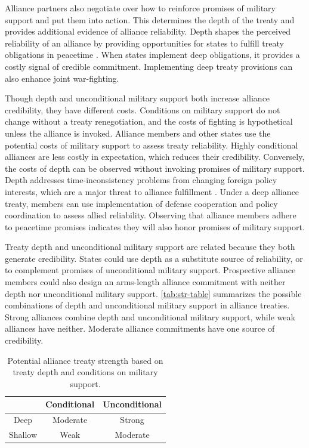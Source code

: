 \documentclass[12pt]{article}
\begin{document}
Alliance partners also negotiate over how to reinforce promises of military support and put them into action. 
This determines the depth of the treaty and provides additional evidence of alliance reliability. 
Depth shapes the perceived reliability of an alliance by providing opportunities for states to fulfill treaty obligations in peacetime \citep{Morrow1994}. 
When states implement deep obligations, it provides a costly signal of credible commitment. 
Implementing deep treaty provisions can also enhance joint war-fighting. 


Though depth and unconditional military support both increase alliance credibility, they have different costs. 
Conditions on military support do not change without a treaty renegotiation, and the costs of fighting is hypothetical unless the alliance is invoked.  
Alliance members and other states use the potential costs of military support to assess treaty reliability. 
Highly conditional alliances are less costly in expectation, which reduces their credibility. 
Conversely, the costs of depth can be observed without invoking promises of military support. 
Depth addresses time-inconsistency problems from changing foreign policy interests, which are a major threat to alliance fulfillment \citep{LeedsSavun2007}. 
Under a deep alliance treaty, members can use implementation of defense cooperation and policy coordination to assess allied reliability. 
Observing that alliance members adhere to peacetime promises indicates they will also honor promises of military support. 


Treaty depth and unconditional military support are related because they both generate credibility. 
States could use depth as a substitute source of reliability, or to complement promises of unconditional military support. 
Prospective alliance members could also design an arms-length alliance commitment with neither depth nor unconditional military support. 
\autoref{tab:str-table} summarizes the possible combinations of depth and unconditional military support in alliance treaties. 
Strong alliances combine depth and unconditional military support, while weak alliances have neither. 
Moderate alliance commitments have one source of credibility. 


\begin{table}[hbt!]
\begin{center}
\caption{Potential alliance treaty strength based on treaty depth and conditions on military support.}
\begin{tabular}{ccc} 
                 & Conditional & Unconditional \\
\toprule
          Deep   &  Moderate & Strong \\
         Shallow & Weak      & Moderate \\
 \bottomrule
\end{tabular}
\label{tab:str-table}
\end{center} 
\end{table}
\end{document}
